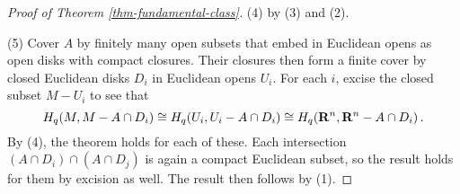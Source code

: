 \begin{proof}[Proof of Theorem \ref{thm-fundamental-class}]
(4) by (3) and (2). 

(5) Cover $A$ by finitely many open subsets that embed in Euclidean
opens as open disks with compact closures. 
Their closures then form a finite cover by closed
Euclidean disks $D_i$ in Euclidean opens $U_i$. For each $i$, 
excise the closed subset $M-U_i$ to see that
\[
H_q(M,M-A\cap D_i)\cong H_q(U_i,U_i-A\cap D_i)\cong 
H_q(\mathbf R^n,\mathbf R^n-A\cap D_i)\,.
\]
By (4), the theorem holds for each of these. Each intersection 
$(A\cap D_i)\cap(A\cap D_j)$ is again a compact Euclidean subset, 
so the result holds for them by excision as well. The result then
follows by (1).
\end{proof}
 








